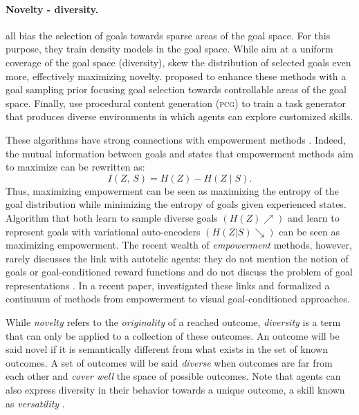 \paragraph{Novelty - diversity.}  \cite{warde2018unsupervised,pong2019skew,pitis2020maximum} all bias the selection of goals towards sparse areas of the goal space. For this purpose, they train density models in the goal space. While \cite{warde2018unsupervised,pong2019skew} aim at a uniform coverage of the goal space (diversity), \cite{pitis2020maximum} skew the distribution of selected goals even more, effectively maximizing novelty. \cite{kovac2020grimgep} proposed to enhance these methods with a goal sampling prior focusing goal selection towards controllable areas of the goal space. Finally, \cite{Fang-RSS-21} use procedural content generation (\textsc{pcg}) to train a task generator that produces diverse environments in which agents can explore customized skills. 

These algorithms have strong connections with empowerment methods \cite{mohamed_variational_2015,gregor2016variational,achiam_variational_2018,eysenbach2018diversity,campos_explore_2020,sharma_dynamics-aware_2020,choi_variational_2021}. Indeed, the mutual information between goals and states that empowerment methods aim to maximize can be rewritten as: 
\begin{equation*}
    I(Z,\,S) = H(Z) - H(Z\mid S).
\end{equation*}
Thus, maximizing empowerment can be seen as maximizing the entropy of the goal distribution while minimizing the entropy of goals given experienced states. Algorithm that both learn to sample diverse goals $(H(Z)\nearrow)$ and learn to represent goals with variational auto-encoders $(H(Z|S)\searrow)$ can be seen as maximizing empowerment. The recent wealth of \textit{empowerment} methods, however, rarely discusses the link with autotelic agents: they do not mention the notion of goals or goal-conditioned reward functions and do not discuss the problem of goal representations \cite{gregor2016variational,achiam_variational_2018,eysenbach2018diversity,campos_explore_2020,sharma_dynamics-aware_2020}. In a recent paper, \cite{choi_variational_2021} investigated these links and formalized a continuum of methods from empowerment to visual goal-conditioned approaches. 

While \textit{novelty} refers to the \textit{originality} of a reached outcome, \textit{diversity} is a term that can only be applied to a collection of these outcomes. An outcome will be said novel if it is semantically different from what exists in the set of known outcomes. A set of outcomes will be said \textit{diverse} when outcomes are far from each other and \textit{cover well} the space of possible outcomes. Note that agents can also express diversity in their behavior towards a unique outcome, a skill known as \textit{versatility} \cite{hausman_learning_2018,kumar_one_2020,osa_discovering_2021,celik_specializing_2021}.

